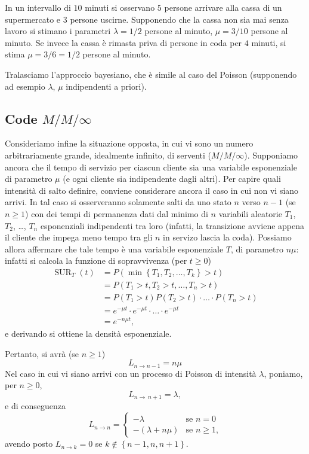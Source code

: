 \documentclass[
  italian,
  letterpaper,
]{book}
\newcommand{\cur}[1]{\left\{ #1 \right\}}
\newcommand{\SUR}{\operatorname{SUR}}
\theoremstyle{definition}
\theoremstyle{remark}
\begin{document}
In un intervallo di \(10\) minuti si osservano \(5\) persone arrivare
alla cassa di un supermercato e \(3\) persone uscirne. Supponendo che la
cassa non sia mai senza lavoro si stimano i parametri \(\lambda = 1/2\)
persone al minuto, \(\mu = 3/10\) persone al minuto. Se invece la cassa
è rimasta priva di persone in coda per \(4\) minuti, si stima
\(\mu = 3/6 =1/2\) persone al minuto.

Tralasciamo l'approccio bayesiano, che è simile al caso del Poisson
(supponendo ad esempio \(\lambda\), \(\mu\) indipendenti a priori).

\subsection{\texorpdfstring{Code
\(M/M/\infty\)}{Code M/M/\textbackslash infty}}\label{code-mminfty}

Consideriamo infine la situazione opposta, in cui vi sono un numero
arbitrariamente grande, idealmente infinito, di serventi
(\(M/M/\infty\)). Supponiamo ancora che il tempo di servizio per ciascun
cliente sia una variabile esponenziale di parametro \(\mu\) (e ogni
cliente sia indipendente dagli altri). Per capire quali intensità di
salto definire, conviene considerare ancora il caso in cui non vi siano
arrivi. In tal caso si osserveranno solamente salti da uno stato \(n\)
verso \(n-1\) (se \(n \ge 1\)) con dei tempi di permanenza dati dal
minimo di \(n\) variabili aleatorie \(T_1\), \(T_2\), \ldots, \(T_n\)
esponenziali indipendenti tra loro (infatti, la transizione avviene
appena il cliente che impega meno tempo tra gli \(n\) in servizo lascia
la coda). Possiamo allora affermare che tale tempo è una variabile
esponenziale \(T\), di parametro \(n\mu\): infatti si calcola la
funzione di sopravvivenza (per \(t\ge 0\))
\begin{equation*}\begin{split} \SUR_T(t) & = P( \min \cur{T_1, T_2, \ldots, T_k} > t )\\
& = P( T_1>t, T_2>t, \ldots, T_n >t) \\
& = P(T_1>t) P(T_2>t) \cdot \ldots\cdot  P(T_n>t) \\
& = e^{-\mu t} \cdot e^{-\mu t} \cdot \ldots \cdot e^{-\mu t}\\
& = e^{-n\mu t},
\end{split}
\end{equation*} e derivando si ottiene la densità esponenziale.

Pertanto, si avrà (se \(n\ge 1\)) \[L_{n \to n-1} = n \mu\] Nel caso in
cui vi siano arrivi con un processo di Poisson di intensità \(\lambda\),
poniamo, per \(n \ge 0\), \[ L_{n \to\ n+1} = \lambda,\] e di
conseguenza
\[ L_{ n \to n} = \begin{cases} -\lambda & \text{se $n = 0$}\\
-(\lambda + n\mu) & \text{se $n \ge 1$,}\end{cases}\] avendo posto
\(L_{ n \to k} = 0\) se \(k \notin \cur{n-1, n, n+1}\).
\end{document}
